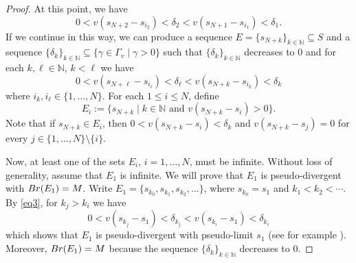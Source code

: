 \documentclass{article}
\theoremstyle{definition}\newtheorem{Def}[equation]{Definition}
\theoremstyle{definition}\newtheorem{Ques}[equation]{Question}
\theoremstyle{definition}\newtheorem{Conj}[equation]{Conjecture}
\theoremstyle{definition}\newtheorem{Not}[equation]{Notation}
\newcommand{\N}{\mathbb{N}}
\newcommand{\Br}{\textnormal{Br}}
\numberwithin{equation}{section}
\begin{document}
\begin{proof}
At this point, we have 
\begin{equation*}
0 < v(s_{N+2}-s_{i_2}) < \delta_2 < v(s_{N+1}-s_{i_1}) < \delta_1.
\end{equation*}
If we continue in this way, we can produce a sequence $E=\{s_{N+k}\}_{k \in \N} \subseteq S$ and a sequence $\{\delta_k\}_{k \in \N} \subseteq \{\gamma \in \Gamma_v \mid \gamma > 0\}$ such that $\{\delta_k\}_{k \in \N}$ decreases to 0 and for each $k, \ell \in \N$, $k < \ell$ we have
\begin{equation}\label{eq3}
0 < v(s_{N+\ell} - s_{i_\ell}) < \delta_{\ell} < v(s_{N+k} - s_{i_k}) < \delta_{k}
\end{equation}
where $i_k, i_\ell \in \{1,\ldots,N\}$.  For each $1\leq i\leq N$, define 
\begin{equation*}
E_i:= \{s_{N+k} \mid k \in \N \text{ and } v(s_{N+k} - s_i) > 0\}.
\end{equation*}
Note that if $s_{N+k} \in E_i$, then $0 < v(s_{N+k}-s_i) < \delta_k$ and $v(s_{N+k}-s_j) = 0$ for every $j\in\{1,\ldots,N\}\setminus\{i\}$. 

Now, at least one of the sets $E_i$, $i=1, \ldots, N$, must be infinite. Without loss of generality, assume that $E_1$ is infinite. We will prove that $E_1$ is pseudo-divergent with $\Br(E_1) = M$. Write $E_1 = \{s_{k_0}, s_{k_1}, s_{k_2}, \ldots\}$, where $s_{k_0}=s_1$ and $k_1 < k_2 < \cdots$. By \eqref{eq3}, for $k_j > k_i$ we have
\begin{equation*}
0 < v(s_{k_j}-s_1) < \delta_{k_j} < v(s_{k_i}-s_1) < \delta_{k_i}
\end{equation*}
which shows that $E_1$ is pseudo-divergent with pseudo-limit $s_1$ (see for example \cite[Remark 4.7]{ChabPolCloVal}). Moreover, $\Br(E_1)=M$ because the sequence $\{\delta_k\}_{k \in \N}$ decreases to 0.
\end{proof}
\end{document}

